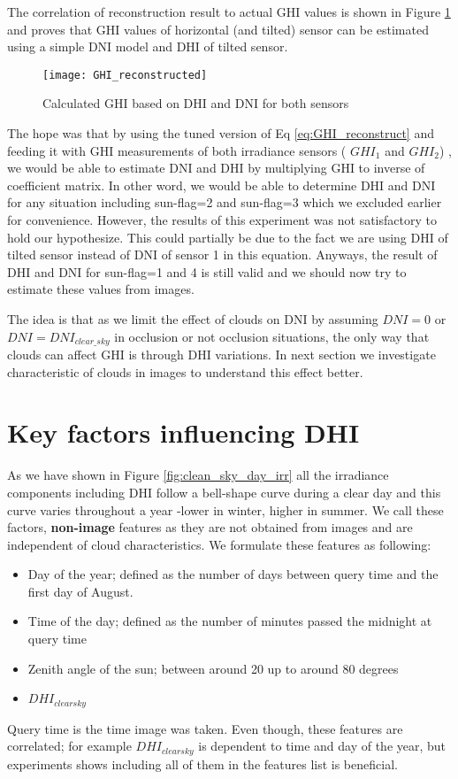 The correlation of reconstruction result to actual GHI values is shown in Figure \ref{fig:GHI_reconstruct_result} and proves that GHI values of horizontal (and tilted) sensor can be estimated using a simple DNI model and DHI of tilted sensor.


\begin{figure}[h]
\caption{Calculated GHI based on DHI and DNI for both sensors}
\label{fig:GHI_reconstruct_result}
\texttt{[image: GHI\_reconstructed]}
\centering
\end{figure}

The hope was that by using the tuned version of Eq \ref{eq:GHI_reconstruct} and feeding it with GHI measurements of both irradiance sensors ( $GHI_1$ and  $GHI_2$) , we would be able to estimate DNI and DHI by multiplying GHI to inverse of coefficient matrix. In other word, we would be able to determine DHI and DNI for any situation including sun-flag=2 and sun-flag=3 which we excluded earlier for convenience. However, the results of this experiment was not satisfactory to hold our hypothesize. This could partially be due to the fact we are using DHI of tilted sensor instead of DNI of sensor 1 in this equation. Anyways,   the result of DHI and DNI for sun-flag=1 and 4 is still valid and we should now try to estimate these values from images.

The idea is that as we limit the effect of clouds on DNI by assuming $DNI=0$ or $DNI=DNI_{clear\_sky}$ in occlusion or not occlusion situations, the only way that clouds can affect GHI is through DHI variations. In next section we investigate characteristic of clouds in images to understand this effect better.

\section{Key factors influencing DHI}
\label{sec:img-features}
As we have shown in Figure \ref{fig:clean_sky_day_irr} all the irradiance components including DHI follow a bell-shape curve during a clear day and this curve varies throughout a year -lower in winter, higher in summer. We call these factors, \textbf{non-image} features as they are not obtained from images and are independent of cloud characteristics. We formulate these features as following:
\begin{itemize}
\item Day of the year; defined as the number of days between query time and the first day of August.
\item Time of the day; defined as the number of minutes passed the midnight at query time
\item Zenith angle of the sun; between around 20 up to around 80 degrees
\item $DHI_{clear sky}$
\end{itemize}
Query time is the time image was taken. Even though, these features are correlated; for example $DHI_{clear sky}$ is dependent to time and day of the year, but experiments shows including all of them in the features list is beneficial.
\newline

